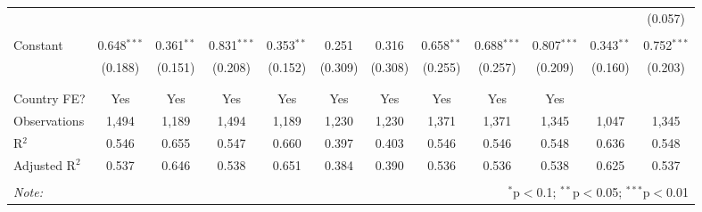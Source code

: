 \begin{table}[!htbp]
\begin{tabular}{@{\extracolsep{5pt}}lccccccccccc}
  &  &  &  &  &  &  &  &  &  &  & (0.057) \\ 
  & & & & & & & & & & & \\ 
 Constant & 0.648$^{***}$ & 0.361$^{**}$ & 0.831$^{***}$ & 0.353$^{**}$ & 0.251 & 0.316 & 0.658$^{**}$ & 0.688$^{***}$ & 0.807$^{***}$ & 0.343$^{**}$ & 0.752$^{***}$ \\ 
  & (0.188) & (0.151) & (0.208) & (0.152) & (0.309) & (0.308) & (0.255) & (0.257) & (0.209) & (0.160) & (0.203) \\ 
  & & & & & & & & & & & \\ 
\hline \\[-1.8ex] 
Country FE? & Yes & Yes & Yes & Yes & Yes & Yes & Yes & Yes & Yes &  &  \\ 
Observations & 1,494 & 1,189 & 1,494 & 1,189 & 1,230 & 1,230 & 1,371 & 1,371 & 1,345 & 1,047 & 1,345 \\ 
R$^{2}$ & 0.546 & 0.655 & 0.547 & 0.660 & 0.397 & 0.403 & 0.546 & 0.546 & 0.548 & 0.636 & 0.548 \\ 
Adjusted R$^{2}$ & 0.537 & 0.646 & 0.538 & 0.651 & 0.384 & 0.390 & 0.536 & 0.536 & 0.538 & 0.625 & 0.537 \\ 
\hline 
\hline \\[-1.8ex] 
\textit{Note:}  & \multicolumn{11}{r}{$^{*}$p$<$0.1; $^{**}$p$<$0.05; $^{***}$p$<$0.01} \\ 
\end{tabular} 
\end{table} 
